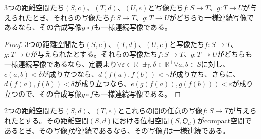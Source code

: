 \documentclass[dvipdfmx]{jsarticle}
\begin{document}
\begin{thm}\label{8.2.4.2}
3つの距離空間たち$(S,c)$、$(T,d)$、$(U,e)$と写像たち$f:S \rightarrow T$、$g:T \rightarrow U$が与えられたとき、それらの写像たち$f:S \rightarrow T$、$g:T \rightarrow U$がどちらも一様連続写像であるなら、その合成写像$g \circ f$も一様連続写像である。
\end{thm}
\begin{proof}
3つの距離空間たち$(S,c)$、$(T,d)$、$(U,e)$と写像たち$f:S \rightarrow T$、$g:T \rightarrow U$が与えられたとする。それらの写像たち$f:S \rightarrow T$、$g:T \rightarrow U$がどちらも一様連続写像であるなら、定義より$\forall\varepsilon \in \mathbb{R}^{+}\exists\gamma,\delta \in \mathbb{R}^{+}\forall a,b \in S$に対し、$c(a,b) < \delta$が成り立つなら、$d\left( f(a),f(b) \right) < \gamma$が成り立ち、さらに、$d\left( f(a),f(b) \right) < \delta$が成り立つなら、$e\left( g\left( f(a) \right),g\left( f(b) \right) \right) < \varepsilon$が成り立つので、その合成写像$g \circ f$も一様連続写像である。
\end{proof}
\begin{thm}\label{8.2.4.3}
2つの距離空間たち$(S,d)$、$(T,e)$とこれらの間の任意の写像$f:S \rightarrow T$が与えられたとする。その距離空間$(S,d)$における位相空間$\left( S,\mathfrak{O}_{d} \right)$がcompact空間であるとき、その写像$f$が連続であるなら、その写像$f$は一様連続である。
\end{thm}
\end{document}
